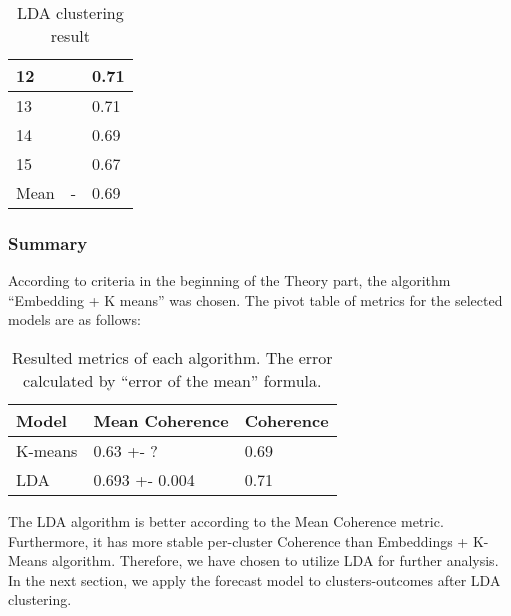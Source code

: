 \begin{table}[h]
\begin{tabular}{|l|l|l|}
12                                        &                                              & 0.71                                    \\ \hline
13                                        &                                              & 0.71                                    \\ \hline
14                                        &                                              & 0.69                                    \\ \hline
15                                        &                                              & 0.67                                    \\ \hline
Mean                                      & -                                            & 0.69                                    \\ \hline
\end{tabular}
\caption{LDA clustering result}
\label{tab:LDAClusters}
\end{table}

\subsubsection{Summary}
According to criteria in the beginning of the Theory part, the algorithm “Embedding + K means” was chosen. The pivot table of metrics for the selected models are as follows:

\begin{table}[h]
\centering
\begin{tabular}{|l|l|l|}
\hline
\textbf{Model} & \textbf{Mean Coherence} & \multicolumn{1}{c|}{\textbf{Coherence}} \\ \hline
K-means        & 0.63 +- ?               & 0.69                                    \\ \hline
LDA            & 0.693 +- 0.004          & 0.71                                    \\ \hline
\end{tabular}
\caption{Resulted metrics of each algorithm. The error calculated by “error of the mean” formula.
}
\label{tab:ClusteringPivotTable}
\end{table}

The LDA algorithm is better according to the Mean Coherence metric. Furthermore, it has more stable per-cluster Coherence than Embeddings + K-Means algorithm. Therefore, we have chosen to utilize LDA  for further analysis. In the next section, we apply the forecast model to clusters-outcomes after LDA clustering.

